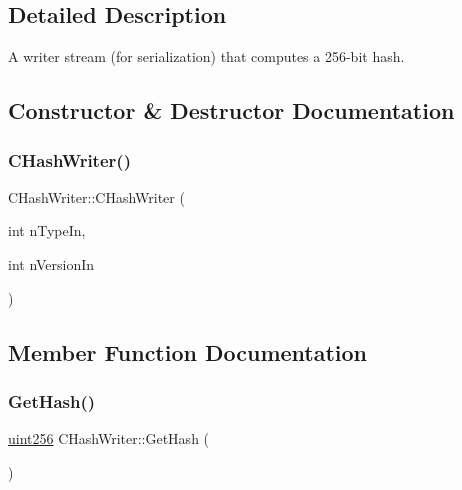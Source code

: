 \subsection{Detailed Description}
A writer stream (for serialization) that computes a 256-\/bit hash. 

\subsection{Constructor \& Destructor Documentation}
\mbox{\label{class_c_hash_writer_a81ce9a497a72fcb6b2612efdc20efbc9}} 
\subsubsection{\texorpdfstring{C\+Hash\+Writer()}{CHashWriter()}}
{\footnotesize\ttfamily C\+Hash\+Writer\+::\+C\+Hash\+Writer (\begin{DoxyParamCaption}\item[{int}]{n\+Type\+In,  }\item[{int}]{n\+Version\+In }\end{DoxyParamCaption})\hspace{0.3cm}{\ttfamily [inline]}}



\subsection{Member Function Documentation}
\mbox{\label{class_c_hash_writer_ae94a937211502eabf19477630090093a}} 
\subsubsection{\texorpdfstring{Get\+Hash()}{GetHash()}}
{\footnotesize\ttfamily \mbox{\hyperlink{classuint256}{uint256}} C\+Hash\+Writer\+::\+Get\+Hash (\begin{DoxyParamCaption}{ }\end{DoxyParamCaption})\hspace{0.3cm}{\ttfamily [inline]}}

\mbox{\label{class_c_hash_writer_a6551aed7315be5ba750680df18562f3a}} 
